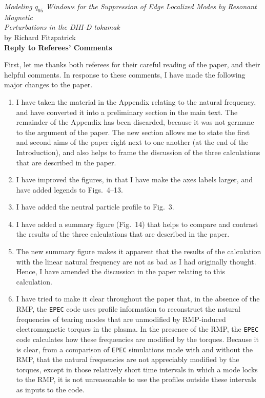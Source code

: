 \documentclass{article}[12pt]
\begin{document}
\begin{center}
{\em Modeling $q_{95}$ Windows for the Suppression of Edge Localized Modes by Resonant Magnetic}\\[0.5ex]
{\em Perturbations in the DIII-D tokamak}\\[1ex]
by Richard Fitzpatrick\\[1ex]
{\bf Reply to Referees' Comments}
\end{center}

First, let me thanks both referees for their careful reading of the paper, and their helpful comments. In response to these 
comments, I have made the following major changes to the paper.
\begin{enumerate}
\item I have taken the material in the Appendix relating to the natural frequency, and have converted it into a
preliminary section in the main text. The remainder of the Appendix has been discarded, because it was
not germane to the argument of the paper. The new section allows me to state the first and second aims of
the paper right next to one another (at the end of the Introduction), and also helps to frame the discussion of the three calculations 
that are described in the paper. 
\item I have improved the figures, in that  I have  make the axes labels larger, and
have added legends to Figs.~4--13. 
\item I have added the neutral particle profile to Fig.~3.
\item I have added a summary figure (Fig.~14) that helps to compare and
contrast the results of the three calculations that are described in the paper.
\item The new summary figure makes it apparent that the results of the calculation with the linear natural frequency are
not as bad as I had originally thought. Hence, I have amended the discussion in the paper relating to this calculation.
\item I have tried to make it clear throughout the paper that, in the absence of the RMP,  the  {\tt EPEC} code uses profile information to reconstruct the natural frequencies
of tearing modes that are unmodified by RMP-induced electromagnetic torques in the plasma. In the presence of the RMP, the {\tt EPEC} code
calculates how these frequencies are modified by the torques. 
 Because it is clear, from a comparison of {\tt EPEC} simulations made with and without the RMP, that
the natural frequencies are not appreciably modified by the torques, except in those relatively short time intervals
in which a mode locks to the RMP, it is not unreasonable to use the profiles outside these intervals as inputs to the code. 
\end{enumerate}
\end{document}
